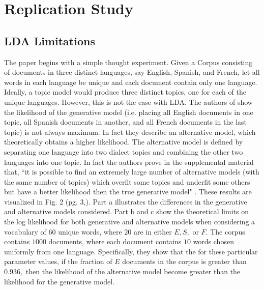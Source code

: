 \documentclass[12pt]{article}
\begin{document}
\newpage
\appendix
\hypertarget{A}{}
\section{Replication Study}
\subsection{LDA Limitations}
The paper \cite{main} begins with a simple thought experiment. Given a Corpus consisting of documents in three distinct languages, say English, Spanish, and French, let all words in each language be unique and each document contain only one language. Ideally, a topic model would produce three distinct topics, one for each of the unique languages. However, this is not the case with LDA. The authors of \cite{main} show the likelihood of the generative model (i.e. placing all English documents in one topic, all Spanish documents in another, and all French documents in the last topic) is not always maximum. In fact they describe an alternative model, which theoretically obtains a higher likelihood. The alternative model is defined by separating one language into two dialect topics and combining the other two languages into one topic. In fact the authors prove in the supplemental material that, ``it is possible to find an extremely large number of alternative models (with the same number of topics) which overfit some topics and underfit some others but have a better likelihood then the true generative model" \cite{mainExtra}. These results are visualized in Fig. 2 (pg. 3,\cite{main}). Part a illustrates the differences in the generative and alternative models considered. Part b and c show the theoretical limits on the log likelihood for both generative and alternative models when considering a vocabulary of $60$ unique words, where $20$ are in either $E, S,$ or $F$. The corpus contains $1000$ documents, where each document contains $10$ words chosen uniformly from one language. Specifically, they show that the for these particular parameter values, if the fraction of $E$ documents in the corpus is greater than $0.936,$ then the likelihood of the alternative model become greater than the likelihood for the generative model. 
\\
\end{document}
